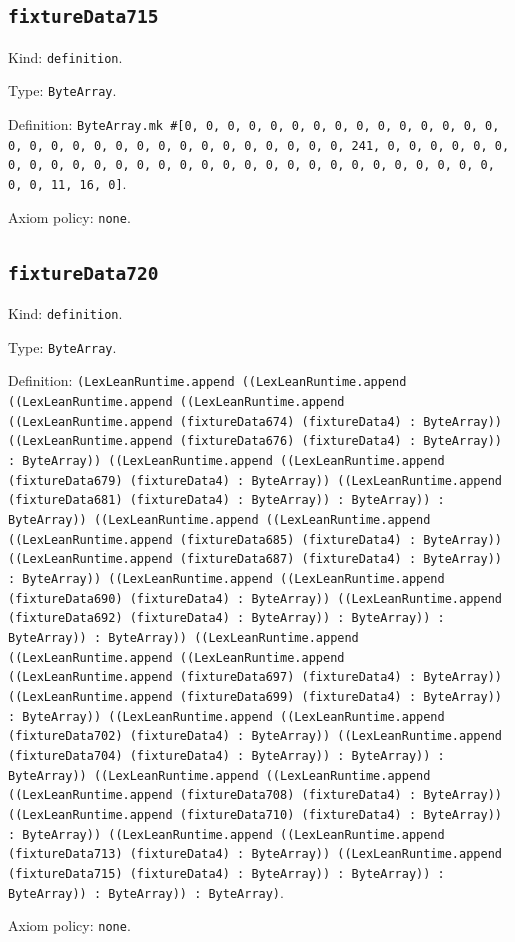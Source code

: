 \documentclass[11pt]{article}
\begin{document}
\subsection*{\texttt{fixtureData715}}
\noindent Kind: \texttt{definition}.\par
\noindent Type: \texttt{ByteArray}.\par
\noindent Definition: \texttt{ByteArray.mk \#[0, 0, 0, 0, 0, 0, 0, 0, 0, 0, 0, 0, 0, 0, 0, 0, 0, 0, 0, 0, 0, 0, 0, 0, 0, 0, 0, 0, 0, 0, 0, 241, 0, 0, 0, 0, 0, 0, 0, 0, 0, 0, 0, 0, 0, 0, 0, 0, 0, 0, 0, 0, 0, 0, 0, 0, 0, 0, 0, 0, 0, 0, 0, 11, 16, 0]}.\par
\noindent Axiom policy: \texttt{none}.\par
\subsection*{\texttt{fixtureData720}}
\noindent Kind: \texttt{definition}.\par
\noindent Type: \texttt{ByteArray}.\par
\noindent Definition: \texttt{(LexLeanRuntime.append ((LexLeanRuntime.append ((LexLeanRuntime.append ((LexLeanRuntime.append ((LexLeanRuntime.append (fixtureData674) (fixtureData4) : ByteArray)) ((LexLeanRuntime.append (fixtureData676) (fixtureData4) : ByteArray)) : ByteArray)) ((LexLeanRuntime.append ((LexLeanRuntime.append (fixtureData679) (fixtureData4) : ByteArray)) ((LexLeanRuntime.append (fixtureData681) (fixtureData4) : ByteArray)) : ByteArray)) : ByteArray)) ((LexLeanRuntime.append ((LexLeanRuntime.append ((LexLeanRuntime.append (fixtureData685) (fixtureData4) : ByteArray)) ((LexLeanRuntime.append (fixtureData687) (fixtureData4) : ByteArray)) : ByteArray)) ((LexLeanRuntime.append ((LexLeanRuntime.append (fixtureData690) (fixtureData4) : ByteArray)) ((LexLeanRuntime.append (fixtureData692) (fixtureData4) : ByteArray)) : ByteArray)) : ByteArray)) : ByteArray)) ((LexLeanRuntime.append ((LexLeanRuntime.append ((LexLeanRuntime.append ((LexLeanRuntime.append (fixtureData697) (fixtureData4) : ByteArray)) ((LexLeanRuntime.append (fixtureData699) (fixtureData4) : ByteArray)) : ByteArray)) ((LexLeanRuntime.append ((LexLeanRuntime.append (fixtureData702) (fixtureData4) : ByteArray)) ((LexLeanRuntime.append (fixtureData704) (fixtureData4) : ByteArray)) : ByteArray)) : ByteArray)) ((LexLeanRuntime.append ((LexLeanRuntime.append ((LexLeanRuntime.append (fixtureData708) (fixtureData4) : ByteArray)) ((LexLeanRuntime.append (fixtureData710) (fixtureData4) : ByteArray)) : ByteArray)) ((LexLeanRuntime.append ((LexLeanRuntime.append (fixtureData713) (fixtureData4) : ByteArray)) ((LexLeanRuntime.append (fixtureData715) (fixtureData4) : ByteArray)) : ByteArray)) : ByteArray)) : ByteArray)) : ByteArray)}.\par
\noindent Axiom policy: \texttt{none}.\par
\end{document}
